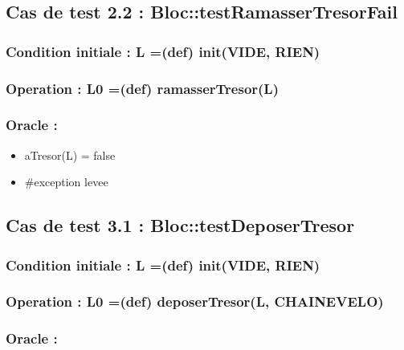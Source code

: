\documentclass[11pt]{article}
\begin{document}
\subsection{Cas de test 2.2 : Bloc::testRamasserTresorFail}
\label{sec-1.4}

\subsubsection{Condition initiale : L =(def) init(VIDE, RIEN)}
\label{sec-1.4.1}

\subsubsection{Operation : L0 =(def) ramasserTresor(L)}
\label{sec-1.4.2}

\subsubsection{Oracle :}
\label{sec-1.4.3}

\begin{itemize}

\item aTresor(L) = false\\
\label{sec-1.4.3.1}


\item \#exception levee\\
\label{sec-1.4.3.2}





\end{itemize} %
\subsection{Cas de test 3.1 : Bloc::testDeposerTresor}
\label{sec-1.5}

\subsubsection{Condition initiale : L =(def) init(VIDE, RIEN)}
\label{sec-1.5.1}

\subsubsection{Operation : L0 =(def) deposerTresor(L, CHAINEVELO)}
\label{sec-1.5.2}

\subsubsection{Oracle :}
\label{sec-1.5.3}
\end{document}
